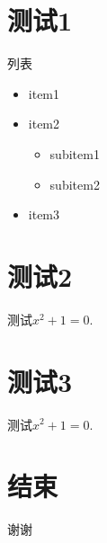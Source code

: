 \documentclass[aspectratio=43]{ctexbeamer}
\begin{document}
	
	\section{测试1}
	\begin{frame}
		列表
		
		\begin{itemize}
			\item item1
			\item item2
			\begin{itemize}
				\item subitem1
				\item subitem2
			\end{itemize}
			\item item3
		\end{itemize}
	\end{frame}
	
	\section{测试2}
	\begin{frame}
		\begin{example}
			测试$x^2+1=0.$
		\end{example}
	\end{frame}
	
	\section{测试3}
	\begin{frame}
		\begin{theorem}
			测试$x^2+1=0.$
		\end{theorem}
	\end{frame}
	
	\section{结束}
	\begin{frame}
		\begin{center}
			\LARGE 谢谢
		\end{center}
	\end{frame}
	
\end{document}
